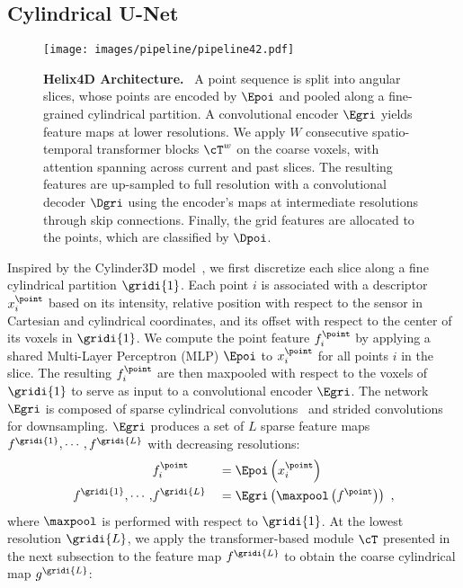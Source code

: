 \documentclass[runningheads]{tpls/llncs}
\begin{document}
\subsection{Cylindrical U-Net}
\begin{figure*}[t]
    \centering
    \texttt{[image: images/pipeline/pipeline42.pdf]}
    \caption{\textbf{Helix4D Architecture.}~
    A point sequence is split into angular slices, whose points are encoded by $\Epoi$ and pooled along a fine-grained cylindrical partition. A convolutional encoder $\Egri$ yields feature maps at lower resolutions. We apply $W$ consecutive spatio-temporal transformer blocks
    $\cT^w$ on the coarse voxels, with attention spanning across current and past slices.
    The resulting {features}
    are up-sampled to full resolution with a convolutional decoder $\Dgri$ using the encoder's maps at intermediate resolutions through skip connections. Finally, the grid features are allocated to the points, which are classified by $\Dpoi$.}
    \label{fig:pipeline}
\end{figure*}
Inspired by the Cylinder3D model~\cite{zhu2021cylindrical}, we first discretize each slice along a fine cylindrical partition $\gridi{1}$. Each point $i$ is associated with a descriptor $x^\point_i$ based on its intensity, relative position with respect to the sensor in Cartesian and cylindrical coordinates, and its offset with respect to the center of its voxels in $\gridi{1}$.  
We compute the point feature $f^\point_i$ by applying a shared Multi-Layer Perceptron (MLP) $\Epoi$ to $x^\point_i$ for all points $i$ in the slice. The resulting $f^\point_i$ are then maxpooled with respect to the voxels of $\gridi{1}$ to serve as input to a convolutional encoder $\Egri$. The network $\Egri$ is composed of sparse cylindrical convolutions~\cite{SubmanifoldSparseConvNet} and strided convolutions for downsampling. $\Egri$ produces a set of $L$ sparse feature maps $f^{\gridi{1}}, \cdots, f^{\gridi{L}}$ with decreasing resolutions:
\begin{alignat}{2}
    &f_i^\point &&= \Epoi\left(x^\point_i\right)\\
    f^\gridi{1}, \cdots, &f^\gridi{L} &&= \Egri\left(\maxpool\left(f^\point\right)\right)~,
\end{alignat}
where $\maxpool$ is performed with respect to $\gridi{1}$.
At the lowest resolution $\gridi{L}$, we apply the transformer-based module $\cT$ presented in the next subsection to the feature map $f^\gridi{L}$ to obtain the coarse cylindrical map $g^\gridi{L}$:
\end{document}
